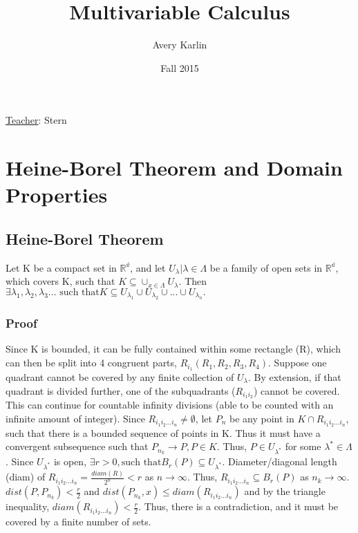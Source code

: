 \documentclass[11 pt, twoside]{article}
\begin{document}
\title{Multivariable Calculus}
\author{Avery Karlin}
\date{Fall 2015}

\maketitle
\newpage
\tableofcontents
\vspace{11pt}
\noindent
\underline{Teacher}: Stern
\newpage


\section{Heine-Borel Theorem and Domain Properties}

\subsection{Heine-Borel Theorem}
Let K be a compact set in $\mathbb{R^d}$, and let ${U_\lambda | \lambda \in \Lambda}$ be a family of open sets in $\mathbb{R^d}$, which covers K, such that $K \subseteq \cup_{x \in \Lambda}U_\lambda$. Then $\exists \lambda_1, \lambda_2, \lambda_3 \text{... such that} K \subseteq U_{\lambda_1} \cup U_{\lambda_2} \cup \text{...} \cup U_{\lambda_n}.$

\subsubsection{Proof}
Since K is bounded, it can be fully contained within some rectangle (R), which can then be split into 4 congruent parts, $R_{i_1} (R_1, R_2, R_3, R_4)$. Suppose one quadrant cannot be covered by any finite collection of $U_\lambda$. By extension, if that quadrant is divided further, one of the subquadrants ($R_{i_1i_2}$) cannot be covered. This can continue for countable infinity divisions (able to be counted with an infinite amount of integer). Since $R_{i_1i_2...i_n} \neq \emptyset$, let $P_n$ be any point in $K \cap R_{i_1i_2...i_n}$, such that there is a bounded sequence of points in K. Thus it must have a convergent subsequence such that $P_{n_k} \to P, P \in K$. Thus, $P \in U_{\lambda^*}$ for some $\lambda^* \in \Lambda$. Since $U_{\lambda^*}$ is open, $\exists r > 0, \text{such that} B_r(P) \subseteq U_{\lambda^*}$. Diameter/diagonal length (diam) of $ R_{i_1i_2...i_n} = \frac{diam(R)}{2^n} < r$ as $n \to \infty$. Thus, $R_{i_1i_2...i_n} \subseteq B_r(P)$ as $n_k \to \infty$. $dist(P, P_{n_k}) < \frac{r}{2}$ and $dist(P_{n_k}, x) \leq diam(R_{i_1i_2...i_n})$ and by the triangle inequality, $diam(R_{i_1i_2...i_n}) < \frac{r}{2}$. Thus, there is a contradiction, and it must be covered by a finite number of sets.
\end{document}

